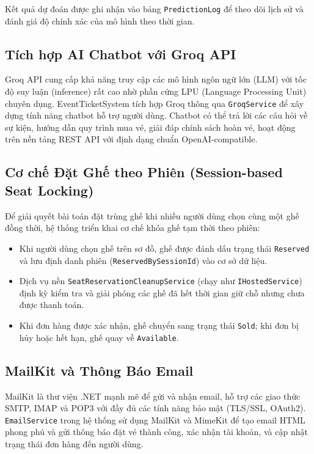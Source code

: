 \documentclass[../main.tex]{subfiles}
\begin{document}
Kết quả dự đoán được ghi nhận vào bảng \texttt{PredictionLog} để theo dõi lịch sử và đánh giá độ chính xác của mô hình theo thời gian.

\subsection{Tích hợp AI Chatbot với Groq API}

Groq API cung cấp khả năng truy cập các mô hình ngôn ngữ lớn (LLM) với tốc độ suy luận (inference) rất cao nhờ phần cứng LPU (Language Processing Unit) chuyên dụng. EventTicketSystem tích hợp Groq thông qua \texttt{GroqService} để xây dựng tính năng chatbot hỗ trợ người dùng. Chatbot có thể trả lời các câu hỏi về sự kiện, hướng dẫn quy trình mua vé, giải đáp chính sách hoàn vé, hoạt động trên nền tảng REST API với định dạng chuẩn OpenAI-compatible.

\subsection{Cơ chế Đặt Ghế theo Phiên (Session-based Seat Locking)}

Để giải quyết bài toán đặt trùng ghế khi nhiều người dùng chọn cùng một ghế đồng thời, hệ thống triển khai cơ chế khóa ghế tạm thời theo phiên:

\begin{itemize}
    \item Khi người dùng chọn ghế trên sơ đồ, ghế được đánh dấu trạng thái \texttt{Reserved} và lưu định danh phiên (\texttt{ReservedBySessionId}) vào cơ sở dữ liệu.
    \item Dịch vụ nền \texttt{SeatReservationCleanupService} (chạy như \texttt{IHostedService}) định kỳ kiểm tra và giải phóng các ghế đã hết thời gian giữ chỗ nhưng chưa được thanh toán.
    \item Khi đơn hàng được xác nhận, ghế chuyển sang trạng thái \texttt{Sold}; khi đơn bị hủy hoặc hết hạn, ghế quay về \texttt{Available}.
\end{itemize}

\subsection{MailKit và Thông Báo Email}

MailKit là thư viện .NET mạnh mẽ để gửi và nhận email, hỗ trợ các giao thức SMTP, IMAP và POP3 với đầy đủ các tính năng bảo mật (TLS/SSL, OAuth2). \texttt{EmailService} trong hệ thống sử dụng MailKit và MimeKit để tạo email HTML phong phú và gửi thông báo đặt vé thành công, xác nhận tài khoản, và cập nhật trạng thái đơn hàng đến người dùng.
\end{document}
